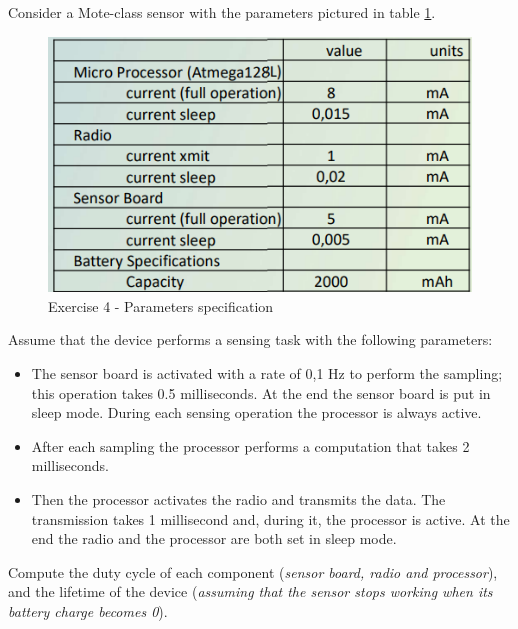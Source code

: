 Consider a Mote-class sensor with the parameters pictured in table \ref{chenergy-ex4}.
\begin{figure}
	\centering\includegraphics[scale=0.50]{images/Pasted image 20230328174646.png}
	\caption{Exercise 4 - Parameters specification}
	\label{chenergy-ex4}
\end{figure}


Assume that the device performs a sensing task with the following parameters:
\begin{itemize}
	\item 
	The sensor board is activated with a rate of 0,1 Hz to perform the sampling; this operation takes 0.5 milliseconds. At the end the sensor board is put in sleep mode. During each sensing operation the processor is always active.
	\item 
	After each sampling the processor performs a computation that takes 2 milliseconds.
	\item 
	Then the processor activates the radio and transmits the data. The transmission takes 1 millisecond and, during it, the processor is active. At the end the radio and the processor are both set in sleep mode.
	
\end{itemize}
Compute the duty cycle of each component (\textit{sensor board, radio and processor}), and the lifetime of the device (\textit{assuming that the sensor stops working when its battery charge becomes 0}).
